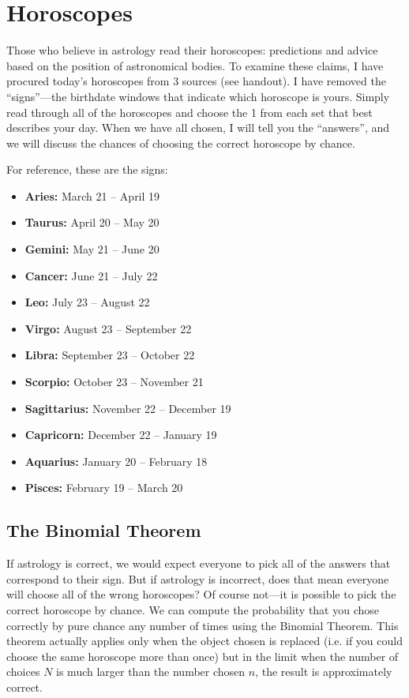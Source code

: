 \documentclass[11pt]{article}
\begin{document}
\section{Horoscopes}
Those who believe in astrology read their horoscopes: predictions and advice based on the position of astronomical bodies. To examine these claims, I have procured today's horoscopes from 3 sources (see handout). I have removed the ``signs''---the birthdate windows that indicate which horoscope is yours. Simply read through all of the horoscopes and choose the 1 from each set that best describes your day. When we have all chosen, I will tell you the ``answers'', and we will discuss the chances of choosing the correct horoscope by chance.

For reference, these are the signs:
\begin{itemize}
    \item \textbf{Aries:} March 21 -- April 19
    \item \textbf{Taurus:} April 20 -- May 20
    \item \textbf{Gemini:} May 21 -- June 20
    \item \textbf{Cancer:} June 21 -- July 22
    \item \textbf{Leo:} July 23 -- August 22
    \item \textbf{Virgo:} August 23 -- September 22
    \item \textbf{Libra:} September 23 -- October 22
    \item \textbf{Scorpio:} October 23 -- November 21
    \item \textbf{Sagittarius:} November 22 -- December 19
    \item \textbf{Capricorn:} December 22 -- January 19
    \item \textbf{Aquarius:} January 20 -- February 18
    \item \textbf{Pisces:} February 19 -- March 20
\end{itemize}

\subsection*{The Binomial Theorem}
If astrology is correct, we would expect everyone to pick all of the answers that correspond to their sign. But if astrology is incorrect, does that mean everyone will choose all of the wrong horoscopes? Of course not---it is possible to pick the correct horoscope by chance. We can compute the probability that you chose correctly by pure chance any number of times using the Binomial Theorem. This theorem actually applies only when the object chosen is replaced (i.e. if you could choose the same horoscope more than once) but in the limit when the number of choices $N$ is much larger than the number chosen $n$, the result is approximately correct.
\end{document}
